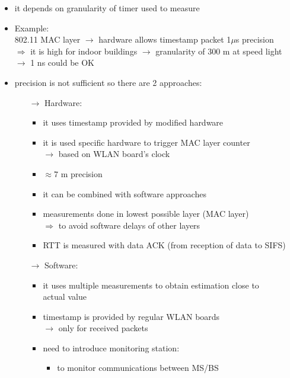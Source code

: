 \begin{itemize} 
    \item it depends on granularity of timer used to measure
    \item Example:\\[0.15cm]
    \hspace*{-0.05cm}802.11 MAC layer $\rightarrow$ hardware allows timestamp packet  1$\mu$s precision\\
    $\Rightarrow$ it is high for indoor buildings $\rightarrow$ granularity of 300 m at speed light\\
    $\rightarrow$ 1 ns could be OK
    \item precision is not sufficient so there are 2 approaches:
    \begin{itemize}
        \item[$\rightarrow$] Hardware:
        \begin{itemize}
            \item it uses timestamp provided by modified hardware
            \item it is used specific hardware to trigger MAC layer counter\\
            $\rightarrow$ based on WLAN board's clock
            \item $\approx 7$ m precision
            \item it can be combined with software approaches
            \item measurements done in lowest possible layer (MAC layer)\\
            $\Rightarrow$ to avoid software delays of other layers
            \item RTT is measured with data ACK (from reception of data to SIFS)
        \end{itemize}
        \newpage
        \item[$\rightarrow$] Software:
        \begin{itemize}
            \item it uses multiple measurements to obtain estimation close to\\
            actual value
            \item timestamp is provided by regular WLAN boards\\
            $\rightarrow$ only for received packets
            \item need to introduce monitoring station:
            \begin{itemize}
                \item to monitor communications between MS/BS

\end{itemize}
\end{itemize}
\end{itemize}
\end{itemize}
